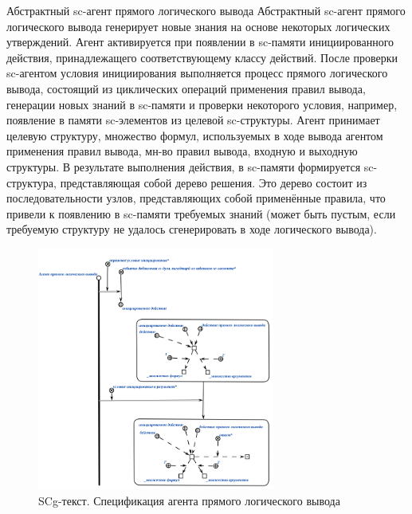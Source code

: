 \begin{frame}{\Large Абстрактный sc-агент прямого логического вывода}
\vspace{10mm}
  Абстрактный sc-агент прямого логического вывода генерирует новые знания на основе некоторых логических утверждений. Агент активируется при появлении в sc-памяти инициированного действия, принадлежащего соответствующему классу действий. После проверки sc-агентом условия инициирования выполняется процесс прямого логического вывода, состоящий из циклических операций применения правил вывода, генерации новых знаний в sc-памяти и проверки некоторого условия, например, появление в памяти sc-элементов из целевой sc-структуры. Агент принимает целевую структуру, множество формул, используемых в ходе вывода агентом применения правил вывода, мн-во правил вывода, входную и выходную структуры. В результате выполнения действия, в sc-памяти формируется sc-структура, представляющая собой дерево решения. Это дерево состоит из последовательности узлов, представляющих собой применённые правила, что привели к появлению в sc-памяти требуемых знаний (может быть пустым, если требуемую структуру не удалось сгенерировать в ходе логического вывода).  
\end{frame}

\begin{frame}{}
\begin{figure}[H]
	\caption{SCg-текст. Спецификация агента прямого логического вывода}
	\includegraphics[width=0.9\linewidth, height=8cm]{figures/sc-agents/direct_inference_agent.png}
\end{figure}
\end{frame}

